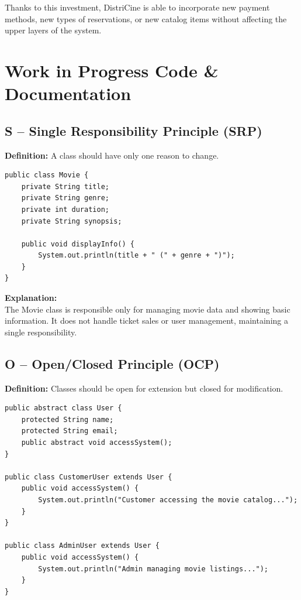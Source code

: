 \documentclass[12pt, letterpaper]{article}
\begin{document}
Thanks to this investment, DistriCine is able to incorporate new payment methods, new types of reservations, or new catalog items without affecting the upper layers of the system.

\section{Work in Progress Code \& Documentation}

\subsection{S -- Single Responsibility Principle (SRP)}

\textbf{Definition:} A class should have only one reason to change.

\begin{lstlisting}[caption=SRP Implementation Example]
public class Movie {
    private String title;
    private String genre;
    private int duration;
    private String synopsis;
    
    public void displayInfo() {
        System.out.println(title + " (" + genre + ")");
    }
}
\end{lstlisting}

\textbf{Explanation:}\\
The Movie class is responsible only for managing movie data and showing basic information. It does not handle ticket sales or user management, maintaining a single responsibility.

\subsection{O -- Open/Closed Principle (OCP)}

\textbf{Definition:} Classes should be open for extension but closed for modification.

\begin{lstlisting}[caption=OCP Implementation Example]
public abstract class User {
    protected String name;
    protected String email;
    public abstract void accessSystem();
}

public class CustomerUser extends User {
    public void accessSystem() {
        System.out.println("Customer accessing the movie catalog...");
    }
}

public class AdminUser extends User {
    public void accessSystem() {
        System.out.println("Admin managing movie listings...");
    }
}
\end{lstlisting}
\end{document}
